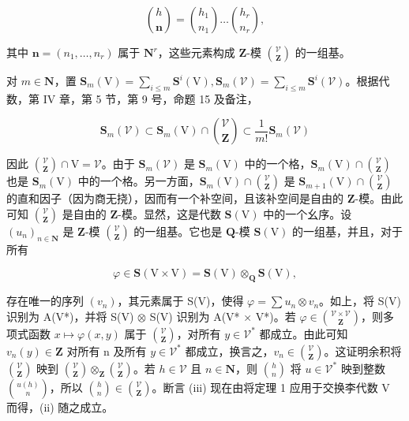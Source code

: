 \[
\binom{h}{\mathbf {n}} = \binom{h _ {1}}{n _ {1}} \dots \binom{h _ {r}}{n _ {r}},
\]

其中 \(\mathbf{n} = (n_1, \ldots, n_r)\) 属于 \(\mathbf{N}^r\)，这些元素构成 \(\mathbf{Z}\)-模 \(\binom{\mathcal{V}}{\mathbf{Z}}\) 的一组基。

对 \(m \in \mathbf{N}\)，置 \(\mathbf{S}_{m}(\mathrm{V}) = \sum_{i \leq m} \mathbf{S}^{i}(\mathrm{V}), \mathbf{S}_{m}(\mathcal{V}) = \sum_{i \leq m} \mathbf{S}^{i}(\mathcal{V})\)。根据代数，第 IV 章，第 5 节，第 9 号，命题 15 及备注，

\[
\mathbf {S} _ {m} (\mathcal {V}) \subset \mathbf {S} _ {m} (\mathrm{V}) \cap \binom{\mathcal {V}}{\mathbf {Z}} \subset \frac {1}{m !} \mathbf {S} _ {m} (\mathcal {V})
\]

因此 \(\binom{\mathcal{V}}{\mathbf{Z}}\cap\mathrm{V}=\mathcal{V}\)。由于 \(\mathbf{S}_{m}(\mathcal{V})\) 是 \(\mathbf{S}_{m}(\mathrm{V})\) 中的一个格，\(\mathbf{S}_{m}(\mathrm{V})\cap\binom{\mathcal{V}}{\mathbf{Z}}\) 也是 \(\mathbf{S}_{m}(\mathrm{V})\) 中的一个格。另一方面，\(\mathbf{S}_{m}(\mathrm{V})\cap\binom{\mathcal{V}}{\mathbf{Z}}\) 是 \(\mathbf{S}_{m+1}(\mathrm{V})\cap\binom{\mathcal{V}}{\mathbf{Z}}\) 的直和因子（因为商无挠），因而有一个补空间，且该补空间是自由的 \(\mathbf{Z}\)-模。由此可知 \(\binom{\mathcal{V}}{\mathbf{Z}}\) 是自由的 \(\mathbf{Z}\)-模。显然，这是代数 \(\mathbf{S}(\mathrm{V})\) 中的一个幺序。设 \((u_{n})_{n\in\mathbf{N}}\) 是 \(\mathbf{Z}\)-模 \(\binom{\mathcal{V}}{\mathbf{Z}}\) 的一组基。它也是 \(\mathbf{Q}\)-模 \(\mathbf{S}(\mathrm{V})\) 的一组基，并且，对于所有

\[
\varphi \in \mathbf {S} (\mathrm{V} \times \mathrm{V}) = \mathbf {S} (\mathrm{V}) \otimes_ {\mathbf {Q}} \mathbf {S} (\mathrm{V}),
\]

存在唯一的序列 \((v_{n})\)，其元素属于 S(V)，使得 \(\varphi=\sum u_{n}\otimes v_{n}\)。如上，将 S(V) 识别为 A(V*)，并将 S(V) \(\otimes\) S(V) 识别为 A(V* × V*)。若 \(\varphi\in\binom{\mathcal{V}\times\mathcal{V}}{\mathbf{Z}}\)，则多项式函数 \(x\mapsto\varphi(x,y)\) 属于 \(\binom{\mathcal{V}}{\mathbf{Z}}\)，对所有 \(y\in\mathcal{V}^{*}\) 都成立。由此可知 \(v_{n}(y)\in\mathbf{Z}\) 对所有 n 及所有 \(y\in\mathcal{V}^{*}\) 都成立，换言之，\(v_{n}\in\binom{\mathcal{V}}{\mathbf{Z}}\)。这证明余积将 \(\binom{\mathcal{V}}{\mathbf{Z}}\) 映到 \(\binom{\mathcal{V}}{\mathbf{Z}}\otimes_{\mathbf{Z}}\binom{\mathcal{V}}{\mathbf{Z}}\)。若 \(h\in\mathcal{V}\) 且 \(n\in\mathbf{N}\)，则 \(\binom{h}{n}\) 将 \(u\in\mathcal{V}^{*}\) 映到整数 \(\binom{u(h)}{n}\)，所以 \(\binom{h}{n}\in\binom{\mathcal{V}}{\mathbf{Z}}\)。断言 (iii) 现在由将定理 1 应用于交换李代数 V 而得，(ii) 随之成立。

